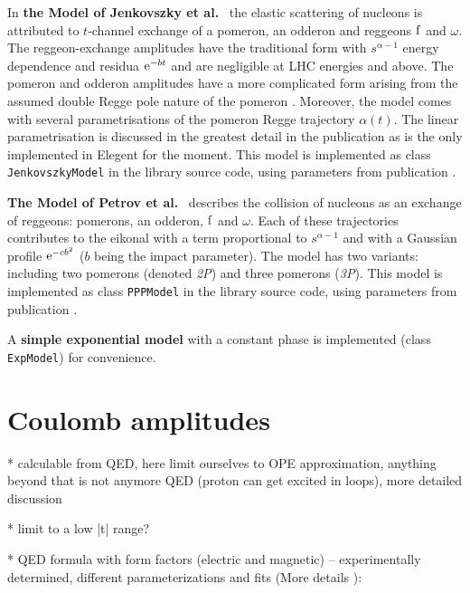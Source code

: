 \documentclass[preprint,12pt]{elsarticle}
\def\class#1{{\tt #1}}
\def\e{{\rm e}}
\begin{document}
In {\bf the Model of Jenkovszky et al.}~\cite{jenkovszky11} the elastic scattering of nucleons is attributed to $t$-channel exchange of a pomeron, an odderon and reggeons $\rm f$ and $\omega$. The reggeon-exchange amplitudes have the traditional form with $s^{\alpha - 1}$ energy dependence and residua $\e^{-bt}$ and are negligible at LHC energies and above. The pomeron and odderon amplitudes have a more complicated form arising from the assumed double Regge pole nature of the pomeron \cite[section 2]{jenkovszky86}. Moreover, the model comes with several parametrisations of the pomeron Regge trajectory $\alpha(t)$. The linear parametrisation is discussed in the greatest detail in the publication as is the only implemented in Elegent for the moment. This model is implemented as class \class{JenkovszkyModel} in the library source code, using parameters from publication \cite{jenkovszky11}.


{\bf The Model of Petrov et al.}~\cite{petrov02} describes the collision of nucleons as an exchange of reggeons: pomerons, an odderon, $\rm f$ and $\omega$. Each of these trajectories contributes to the eikonal with a term proportional to $s^{\alpha - 1}$ and with a Gaussian profile $\e^{-c b^2}$ ($b$ being the impact parameter). The model has two variants: including two pomerons (denoted {\em 2P}\/) and three pomerons ({\em 3P}\/). This model is implemented as class \class{PPPModel} in the library source code, using parameters from publication \cite{petrov02}.


A {\bf simple exponential model} with a constant phase is implemented (class \class{ExpModel}) for convenience.




\section{Coulomb amplitudes}\label{s:coul mod}

* calculable from QED, here limit ourselves to OPE approximation, anything beyond that is not anymore QED (proton can get excited in loops), more detailed discussion \cite[section 1.3.6]{jan_thesis}

* limit to a low |t| range?

* QED formula with form factors (electric and magnetic) -- experimentally determined, different parameterizations and fits (More details \cite[section 1.3.1]{jan_thesis}):
\end{document}
